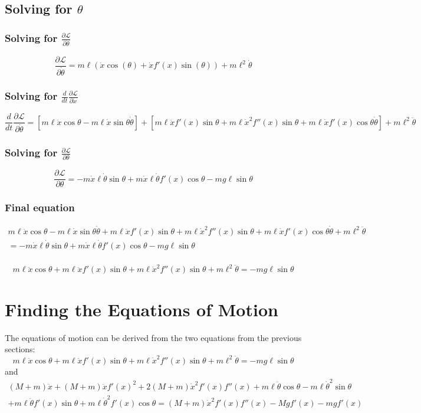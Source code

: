 \documentclass{article}
\begin{document}
\subsection{Solving for $\theta$}
\subsubsection{Solving for $\frac{\partial\mathscr L}{\partial \dot \theta}$}
\[
\frac{\partial\mathscr{L}}{\partial\dot\theta}
=m \ell( \dot x \cos(\theta)+ \dot x f'(x)\sin(\theta))+m \ell^2 \dot \theta
\]
\subsubsection{Solving for $\frac{d}{dt}\frac{\partial\mathscr L}{\partial \dot x}$}
\[
\frac {d}{dt} \frac{\partial\mathscr{L}}{\partial\dot\theta}=
[m\ell\ddot x\cos\theta-m\ell\dot x\sin\theta\dot\theta]+[m\ell\ddot x f'(x)\sin\theta+m\ell\dot x^2 f''(x)\sin\theta+m\ell\dot xf'(x)\cos\theta\dot\theta]+m\ell^2\ddot\theta
\]
\subsubsection{Solving for $\frac{\partial\mathscr L}{\partial \theta}$}
\[\frac{\partial\mathscr{L}}{\partial\theta}=
-m\dot x\ell\dot\theta\sin\theta+m\dot x \ell \dot\theta f'(x)\cos\theta-mg\ell\sin\theta
\]
\subsubsection{Final equation}
\begin{equation}
\begin{aligned}
m\ell\ddot x\cos\theta-m\ell\dot x\sin\theta\dot\theta+m\ell\ddot xf'(x)\sin\theta+m\ell\dot x^2 f''(x)\sin\theta+m\ell\dot x f'(x)\cos\theta\dot\theta+m\ell^2\ddot\theta\\=-m\dot x\ell\dot\theta\sin\theta+m\dot x\ell\dot\theta f'(x)\cos\theta-mg\ell\sin\theta
\end{aligned}
\end{equation}
\\
\[
m\ell\ddot x\cos\theta+m\ell\ddot x f'(x)\sin\theta+m\ell\dot x^2 f''(x)\sin\theta+m\ell^2\ddot\theta=-mg\ell\sin\theta
\]
\section{Finding the Equations of Motion}
The equations of motion can be derived from the two equations from the previous sections: 
\[
m\ell\ddot x\cos\theta+m\ell\ddot x f'(x)\sin\theta+m\ell\dot x^2 f''(x)\sin\theta+m\ell^2\ddot\theta=-mg\ell\sin\theta
\]
and
\begin{equation}
\begin{aligned}
(M+m)\ddot x+(M+m)\ddot xf'(x)^2 +2(M+m)\dot x^2f'(x)f''(x)+m\ell\ddot\theta\cos\theta-m\ell\dot\theta^2\sin\theta\\+m\ell\ddot\theta f'(x)\sin\theta+m\ell\dot\theta^2f'(x)\cos\theta=(M+m)\dot x^2 f'(x)f''(x)-Mgf'(x)-mgf'(x)
\end{aligned}
\end{equation}
\end{document}

